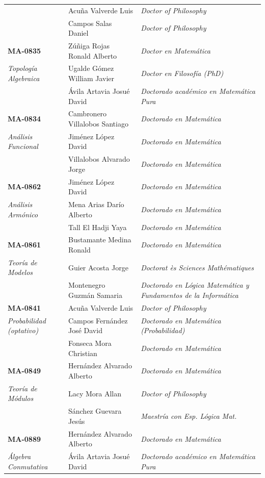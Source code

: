 \begin{landscape}
\begin{longtable}{|>{\columncolor{Celeste-UCR!12}\raggedright\arraybackslash}p{6cm}|>{\raggedright\arraybackslash}p{6.6cm}|>{\raggedright\arraybackslash}p{7.6cm}|}
 & Acuña Valverde Luis & \textit{Doctor of Philosophy} \\
 & Campos Salas Daniel & \textit{Doctor of Philosophy} \\
\hline
\textbf{MA-0835} & Zúñiga Rojas Ronald Alberto & \textit{Doctor en Matemática} \\
\textit{Topología Algebraica} & Ugalde Gómez William Javier & \textit{Doctor en Filosofía (PhD)} \\
 & Ávila Artavia Josué David & \textit{Doctorado académico en Matemática Pura} \\
\hline
\textbf{MA-0834} & Cambronero Villalobos Santiago & \textit{Doctorado en Matemática} \\
\textit{Análisis Funcional} & Jiménez López David & \textit{Doctorado en Matemática} \\
 & Villalobos Alvarado Jorge & \textit{Doctorado en Matemática} \\
\hline
\textbf{MA-0862} & Jiménez López David & \textit{Doctorado en Matemática} \\
\textit{Análisis Armónico} & Mena Arias Darío Alberto & \textit{Doctorado en Matemática} \\
 & Tall El Hadji Yaya & \textit{Doctorado en Matemática} \\
\hline
\textbf{MA-0861} & Bustamante Medina Ronald & \textit{Doctorado en Matemática} \\
\textit{Teoría de Modelos} & Guier Acosta Jorge & \textit{Doctorat ès Sciences Mathématiques} \\
 & Montenegro Guzmán Samaria & \textit{Doctorado en Lógica Matemática y Fundamentos de la Informática} \\
\hline
\textbf{MA-0841} & Acuña Valverde Luis & \textit{Doctor of Philosophy} \\
\textit{Probabilidad (optativo)} & Campos Fernández José David & \textit{Doctorado en Matemática (Probabilidad)} \\
 & Fonseca Mora Christian & \textit{Doctorado en Matemática} \\
\hline
\textbf{MA-0849} & Hernández Alvarado Alberto & \textit{Doctorado en Matemática} \\
\textit{Teoría de Módulos} & Lacy Mora Allan & \textit{Doctor of Philosophy} \\
 & Sánchez Guevara Jesús & \textit{Maestría con Esp. Lógica Mat.} \\
\hline
\textbf{MA-0889} & Hernández Alvarado Alberto & \textit{Doctorado en Matemática} \\
\textit{Álgebra Conmutativa} & Ávila Artavia Josué David & \textit{Doctorado académico en Matemática Pura} \\

\end{longtable}
\end{landscape}
